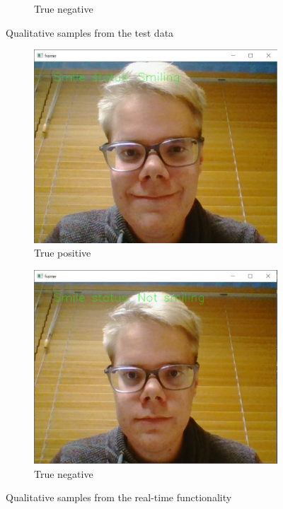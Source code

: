 \documentclass{article}
\begin{document}
\begin{figure}[t]
\begin{minipage}[t]{0.5\textwidth}
\begin{subfigure}[t]{0.5\linewidth}
      \caption{True negative}
    \end{subfigure}
    \caption{Qualitative samples from the test data}\label{fig:tptn}
  \end{minipage}%
  \begin{minipage}[t]{0.5\textwidth}\centering
    \begin{subfigure}[t]{0.5\linewidth}\centering
      \includegraphics[width=0.95\linewidth]{figures/camera_example1.jpg}
      \caption{True positive}
    \end{subfigure}%
    \begin{subfigure}[t]{0.5\linewidth}\centering
      \includegraphics[width=0.95\linewidth]{figures/camera_example2.jpg}
      \caption{True negative}
    \end{subfigure}
    \caption{Qualitative samples from the real-time
      functionality}\label{fig:realtime}
  \end{minipage}
\end{figure}
\end{document}
